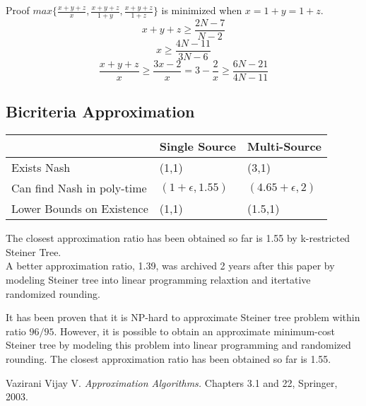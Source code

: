 \documentclass[11pt,psfig,times]{article}
\begin{document}
	{Proof}
		$max\{\frac{x+y+z}{x},\frac{x+y+z}{1+y},\frac{x+y+z}{1+z}\}$ is minimized when $x = 1+y =1+z$. 
		\[x+y+z \geq \frac{2N-7}{N-2}\]
		\[x \geq \frac{4N-11}{3N-6}\]
		\[\frac{x+y+z}{x} \geq \frac{3x-2}{x} = 3-\frac{2}{x} \geq \frac{6N-21}{4N-11} \]
	
	
	\subsection{Bicriteria Approximation}
	\begin{center}
			\begin{tabular} { 
				| m{5cm} | m{3cm}| m{3cm} | }
			   \hline
				& Single Source & Multi-Source\\
			   \hline
			   Exists Nash  & (1,1)  &  (3,1)\\
			  \hline
			  Can find Nash in poly-time & $(1+\epsilon,1.55)$ & $(4.65+\epsilon,2)$\\
			  \hline
			  Lower Bounds on Existence & (1,1) & (1.5,1)\\
			  \hline
			  \end{tabular}
	\end{center}

		  
		The closest approximation ratio has been obtained so far is 1.55 by k-restricted Steiner Tree.\\
		A better approximation ratio, 1.39, was archived 2 years after this paper by modeling Steiner tree into linear programming relaxtion and itertative randomized rounding.
	
	

It has been proven that it is NP-hard to approximate Steiner tree problem within ratio \(96/95\). However, it is possible to obtain an approximate minimum-cost Steiner tree by modeling this problem into linear programming and randomized rounding. The closest approximation ratio has been obtained so far is 1.55.

\begin{thebibliography}{10}
	\setlength{\itemsep}{0pt plus .3pt}
	\setlength{\parsep}{0pt plus .3pt}
	\setlength{\parskip}{0pt plus .3pt}
Vazirani Vijay V. {\em Approximation Algorithms.\/} Chapters 3.1 and 22, Springer, 2003.
\end{thebibliography}
\end{document}
